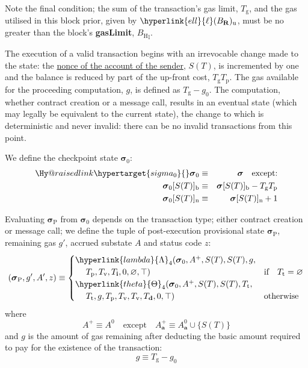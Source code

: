 \documentclass[9pt,oneside]{amsart}
\makeatletter
\newcommand{\linkdest}[1]{\Hy@raisedlink{\hypertarget{#1}{}}}
\makeatother
\begin{document}
\begin{multicols}{2}
Note the final condition; the sum of the transaction's gas limit, $T_{\mathrm{g}}$, and the gas utilised in this block prior, given by $\hyperlink{ell}{\ell}(B_{\mathbf{R}})_{\mathrm{u}}$, must be no greater than the block's \textbf{gasLimit}, ${B_{\mathrm{H}}}_{\mathrm{l}}$.

The execution of a valid transaction begins with an irrevocable change made to the state: the \hyperlink{account_nonce}{nonce of the account of the sender}, $S(T)$, is incremented by one and the balance is reduced by part of the up-front cost, $T_{\mathrm{g}}T_{\mathrm{p}}$. The gas available for the proceeding computation, $g$, is defined as $T_{\mathrm{g}} - g_0$. The computation, whether contract creation or a message call, results in an eventual state (which may legally be equivalent to the current state), the change to which is deterministic and never invalid: there can be no invalid transactions from this point.

We define the checkpoint state $\boldsymbol{\sigma}_0$:
\begin{eqnarray}
\linkdest{sigma_0}{}\boldsymbol{\sigma}_0 & \equiv & \boldsymbol{\sigma} \quad \text{except:} \\
\boldsymbol{\sigma}_0[S(T)]_{\mathrm{b}} & \equiv & \boldsymbol{\sigma}[S(T)]_{\mathrm{b}} - T_{\mathrm{g}} T_{\mathrm{p}} \\
\boldsymbol{\sigma}_0[S(T)]_{\mathrm{n}} & \equiv & \boldsymbol{\sigma}[S(T)]_{\mathrm{n}} + 1
\end{eqnarray}

Evaluating $\boldsymbol{\sigma}_{\mathrm{P}}$ from $\boldsymbol{\sigma}_0$ depends on the transaction type; either contract creation or message call; we define the tuple of post-execution provisional state $\boldsymbol{\sigma}_{\mathrm{P}}$, remaining gas $g'$, accrued substate $A$ and status code $z$:
\begin{equation}
(\boldsymbol{\sigma}_{\mathrm{P}}, g', A', z) \equiv \begin{cases}
\hyperlink{lambda}{\Lambda}_{4}(\boldsymbol{\sigma}_0, A^+, S(T), S(T), g, &\\ \quad\; T_{\mathrm{p}}, T_{\mathrm{v}}, T_{\mathbf{i}}, 0, \varnothing, \top) & \text{if} \quad T_{\mathrm{t}} = \varnothing \\
\hyperlink{theta}{\Theta}_{4}(\boldsymbol{\sigma}_0, A^+, S(T), S(T), T_{\mathrm{t}}, &\\ \quad\; T_{\mathrm{t}}, g, T_{\mathrm{p}}, T_{\mathrm{v}}, T_{\mathrm{v}}, T_{\mathbf{d}}, 0, \top) & \text{otherwise}
\end{cases}
\end{equation}
where
\begin{equation}
A^+ \equiv A^0 \quad \text{except} \quad A^+_{\mathbf{a}} \equiv A^0_{\mathbf{a}} \cup \{S(T)\}
\end{equation}
and $g$ is the amount of gas remaining after deducting the basic amount required to pay for the existence of the transaction:
\begin{equation}
g \equiv T_{\mathrm{g}} - g_0
\end{equation}


\end{multicols}
\end{document}
